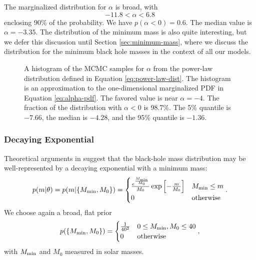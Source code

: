 \documentclass[preprint]{aastex}
\newcommand{\Mmin}{M_{\textnormal{min}}}
\begin{document}
The marginalized distribution for $\alpha$ is broad, with
\begin{equation}
  -11.8 < \alpha < 6.8
\end{equation}
enclosing 90\% of the probability.  We have $p(\alpha < 0) = 0.6$.
The median value is $\alpha = -3.35$.  The distribution of the minimum
mass is also quite interesting, but we defer this discussion until
Section \ref{sec:minimum-mass}, where we discuss the distribution for
the minimum black hole masses in the context of all our models.

\begin{figure}
  \begin{center}
  \end{center}
  \caption{\label{fig:power-law} A histogram of the MCMC samples for
    $\alpha$ from the power-law distribution defined in Equation
    \eqref{eq:power-law-dist}.  The histogram is an approximation to
    the one-dimensional marginalized PDF in Equation
    \eqref{eq:alpha-pdf}.  The favored value is near $\alpha = -4$.
    The fraction of the distribution with $\alpha < 0$ is 98.7\%.  The
    5\% quantile is $-7.66$, the median is $-4.28$, and the 95\%
    quantile is $-1.36$.}
\end{figure}

\subsubsection{Decaying Exponential}
\label{subsubsec:exponential}

Theoretical arguments in \citet{Fryer2001} suggest that the black-hole
mass distribution may be well-represented by a decaying exponential
with a minimum mass:
\begin{equation}
  \label{eq:exp-def}
  p(m|\theta) = p(m|\{\Mmin, M_0\}) = 
  \begin{cases}
    \frac{e^{\frac{\Mmin}{M_0}}}{M_0} \exp \left[ - \frac{m}{M_0}
    \right] & \Mmin \leq m \\
    0 & \textnormal{otherwise}
  \end{cases}.
\end{equation}
We choose again a broad, flat prior
\begin{equation}
  p(\{\Mmin, M_0 \}) = 
  \begin{cases}
    \frac{1}{40^2} & 0 \leq \Mmin, M_0 \leq 40 \\
    0 & \textnormal{otherwise}
  \end{cases},
\end{equation}
with $\Mmin$ and $M_0$ measured in solar masses.
\end{document}
